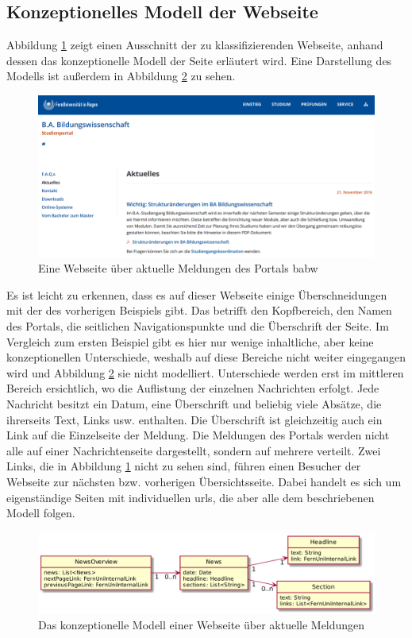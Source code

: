 \subsection{Konzeptionelles Modell der Webseite}
    Abbildung \ref{image:findingNewsModelOverview} zeigt einen
    Ausschnitt der zu klassifizierenden Webseite,
    anhand dessen das konzeptionelle Modell der Seite erläutert wird.
    Eine Darstellung des Modells ist außerdem in Abbildung
    \ref{image:findingNewsModelUml} zu sehen.

    \begin{figure}[htb]
        \centering
        \includegraphics[width=\textwidth]{../resources/findings/case-study-2/news-overview.png}
        \caption{Eine Webseite über aktuelle Meldungen des Portals \acrshort{babw}}
        \label{image:findingNewsModelOverview}
    \end{figure}

    Es ist leicht zu erkennen, dass es auf dieser Webseite einige Überschneidungen
    mit der des vorherigen Beispiels gibt.
    Das betrifft den Kopfbereich, den Namen des Portals,
    die seitlichen Navigationspunkte und die Überschrift der Seite.
    Im Vergleich zum ersten Beispiel gibt es hier nur wenige inhaltliche,
    aber keine konzeptionellen Unterschiede,
    weshalb auf diese Bereiche nicht weiter eingegangen wird und Abbildung
    \ref{image:findingNewsModelUml} sie nicht modelliert.
    Unterschiede werden erst im mittleren Bereich ersichtlich,
    wo die Auflistung der einzelnen Nachrichten erfolgt.
    Jede Nachricht besitzt ein Datum, eine Überschrift und beliebig viele Absätze,
    die ihrerseits Text, Links usw. enthalten.
    Die Überschrift ist gleichzeitig auch ein Link auf die Einzelseite der Meldung.
    Die Meldungen des Portals werden nicht alle auf einer Nachrichtenseite dargestellt,
    sondern auf mehrere verteilt.
    Zwei Links, die in Abbildung \ref{image:findingNewsModelOverview} nicht zu sehen sind,
    führen einen Besucher der Webseite zur nächsten bzw. vorherigen Übersichtsseite.
    Dabei handelt es sich um eigenständige Seiten mit individuellen \glspl{url},
    die aber alle dem beschriebenen Modell folgen.

    \begin{figure}[htb]
        \centering
        \includegraphics[scale=\imageScalingFactor]{../resources/findings/case-study-2/model.png}
        \caption{Das konzeptionelle Modell einer Webseite über aktuelle Meldungen}
        \label{image:findingNewsModelUml}
    \end{figure}